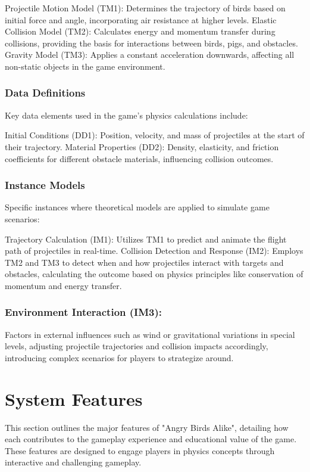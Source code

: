 \documentclass[12pt]{article}
\begin{document}
Projectile Motion Model (TM1): Determines the trajectory of birds based on initial force and angle, incorporating air resistance at higher levels.
Elastic Collision Model (TM2): Calculates energy and momentum transfer during collisions, providing the basis for interactions between birds, pigs, and obstacles.
Gravity Model (TM3): Applies a constant acceleration downwards, affecting all non-static objects in the game environment.
\subsubsection{Data Definitions}
Key data elements used in the game's physics calculations include:

Initial Conditions (DD1): Position, velocity, and mass of projectiles at the start of their trajectory.
Material Properties (DD2): Density, elasticity, and friction coefficients for different obstacle materials, influencing collision outcomes.
\subsubsection{Instance Models}
Specific instances where theoretical models are applied to simulate game scenarios:

Trajectory Calculation (IM1): Utilizes TM1 to predict and animate the flight path of projectiles in real-time.
Collision Detection and Response (IM2): Employs TM2 and TM3 to detect when and how projectiles interact with targets and obstacles, calculating the outcome based on physics principles like conservation of momentum and energy transfer.

\subsubsection{Environment Interaction (IM3):}
Factors in external influences such as wind or gravitational variations in special levels, adjusting projectile trajectories and collision impacts accordingly, introducing complex scenarios for players to strategize around.

\section{System Features}

This section outlines the major features of "Angry Birds Alike", detailing how each contributes to the gameplay experience and educational value of the game. These features are designed to engage players in physics concepts through interactive and challenging gameplay.
\end{document}
